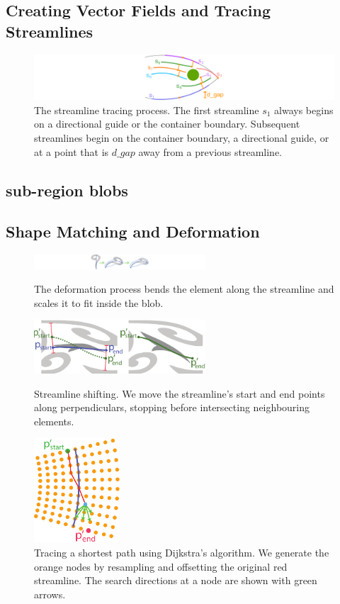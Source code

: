 \subsection{Creating Vector Fields and Tracing Streamlines}

\begin{figure}
\centering
\includegraphics[width=1.0\textwidth]{figures/flowpak/streamline_tracing.pdf}
\caption{\label{streamline_tracing}
The streamline tracing process. The first streamline $s_1$ always begins
on a directional guide or the container boundary.  Subsequent streamlines begin
on the container boundary, a directional guide, or at a point that is 
$d\_gap$ away from a previous streamline.}
\end{figure}

\subsection{sub-region blobs}
\subsection{Shape Matching and Deformation}

\begin{figure}
\centering
\includegraphics[width=6.4cm]{figures/flowpak/shape_deformation.pdf}
\caption{\label{shape_deformation}
The deformation process bends the element along the streamline and
scales it to fit inside the blob.}
\bigskip
 \includegraphics[width=6.4cm]{figures/flowpak/shift_streamline.pdf}
 \caption{\label{shift_streamline}
 Streamline shifting.
 	We move the streamline's start and end points along 
	perpendiculars, stopping before intersecting neighbouring elements.}
\smallskip
\includegraphics[width=3.2cm]{figures/flowpak/dijkstra.pdf}
 \caption{\label{dijkstra}
 Tracing a shortest path using Dijkstra's algorithm.  We generate the 
 orange nodes by resampling and offsetting the original red streamline.
          The search directions at a node are shown with green arrows.}
\end{figure}

